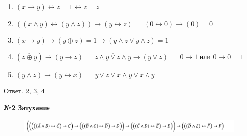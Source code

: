     \begin{enumerate}
        \item $(x \rightarrow y) \leftrightarrow z = 1 \leftrightarrow z = z$

        \item $((x \wedge \overline y) \leftrightarrow (y \wedge z)) \rightarrow (y \leftrightarrow z) = $
        $(0 \leftrightarrow 0) \rightarrow (0) = 0$

        \item $(x \rightarrow y) \rightarrow (y \oplus z) = 1 \rightarrow (\bar y \wedge z \vee y \wedge \bar z) = 1$

        \item $(\overline{z \oplus y}) \rightarrow (y \rightarrow z) = $
        $\overline{\bar z \wedge y \vee z \wedge \bar y} \rightarrow (\bar y \vee z) = $
        $0 \rightarrow 1$  или $0 \rightarrow 0= 1$

        \item $(\overline y \wedge z) \rightarrow (y \leftrightarrow \overline x) = $
        $y \vee \bar z \vee \bar x \wedge y \vee x \wedge \bar y$
    \end{enumerate}
    Ответ: 2, 3, 4

    \begin{center}
        \textbf{№2 Затухание}
    \end{center}

    \begin{figure}[h]
        \centering
        \includegraphics[width=1.2  \linewidth]{images/im1}
    \end{figure}

